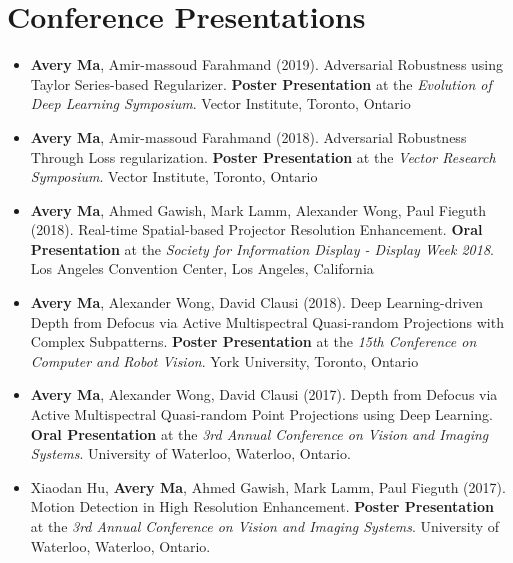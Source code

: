 \section*{Conference Presentations}
\vspace{\postsubhead}
\begin{adjustwidth}{\indentleft}{\indentright}
 \begin{itemize}
    \setlength\itemsep{0.5em}
    
    \item \textbf{Avery Ma}, Amir-massoud Farahmand (2019). Adversarial Robustness using Taylor Series-based Regularizer. \textbf{Poster Presentation} at the \emph{Evolution of Deep Learning Symposium}. Vector Institute, Toronto, Ontario
    
    \item \textbf{Avery Ma}, Amir-massoud Farahmand (2018). Adversarial Robustness Through Loss regularization. \textbf{Poster Presentation} at the \emph{Vector Research Symposium}. Vector Institute, Toronto, Ontario
    
    \item \textbf{Avery Ma}, Ahmed Gawish, Mark Lamm, Alexander Wong, Paul Fieguth (2018). Real-time Spatial-based Projector Resolution Enhancement. \textbf{Oral Presentation} at the \emph{Society for Information Display - Display Week 2018}. Los Angeles Convention Center, Los Angeles, California
    
    \item \textbf{Avery Ma}, Alexander Wong, David Clausi (2018). Deep Learning-driven Depth from Defocus via Active Multispectral Quasi-random Projections with Complex Subpatterns. \textbf{Poster Presentation} at the \emph{15th Conference on Computer and Robot Vision}. York University, Toronto, Ontario
            
    \item \textbf{Avery Ma}, Alexander Wong, David Clausi (2017). Depth from Defocus via Active Multispectral Quasi-random Point Projections using Deep Learning. \textbf{Oral Presentation} at the \emph{3rd Annual Conference on Vision and Imaging Systems}. University of Waterloo, Waterloo, Ontario.
    
    \item Xiaodan Hu, \textbf{Avery Ma}, Ahmed Gawish, Mark Lamm, Paul Fieguth (2017). Motion Detection in High Resolution Enhancement. \textbf{Poster Presentation} at the \emph{3rd Annual Conference on Vision and Imaging Systems}. University of Waterloo, Waterloo, Ontario.
    

\end{itemize}
\end{adjustwidth}
